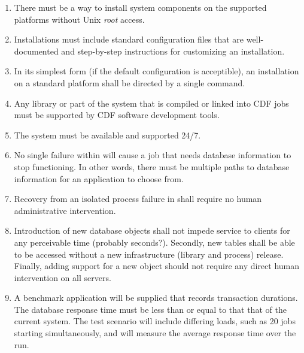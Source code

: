 \begin{enumerate}

\item

There must be a way to install \frontier system components on the
supported platforms without Unix \emph{root} access.

\item

Installations must include standard configuration files that are
well-documented and step-by-step instructions for customizing an
installation.

\item

In its simplest form (\ie if the default configuration is acceptible),
an installation on a standard platform shall be directed by a single
command.

\item

Any library or part of the system that is compiled or linked into CDF
jobs must be supported by CDF software development tools.

\item

The system must be available and supported 24/7.

\item

No single failure within \frontier will cause a job that needs database
information to stop functioning. In other words, there must be
multiple paths to database information for an application to choose
from.

\item

Recovery from an isolated process failure in \frontier shall require no
human administrative intervention.

\item

Introduction of new database objects shall not impede service to
clients for any perceivable time (probably seconds?). Secondly, new
tables shall be able to be accessed without a new infrastructure
(library and process) release. Finally, adding support for a new
object should not require any direct human intervention on all \frontier
servers.

\item

A benchmark application will be supplied that records transaction
durations. The database response time must be less than or equal to
that that of the current system.  The test scenario will include
differing loads, such as 20 jobs starting simultaneously, and will
measure the average response time over the run.


\end{enumerate}

